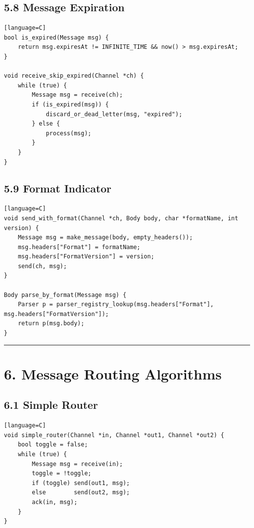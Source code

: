 \documentclass[11pt]{article}
\begin{document}
\subsection{5.8 Message Expiration}\label{message-expiration}

\begin{verbatim}[language=C]
bool is_expired(Message msg) {
    return msg.expiresAt != INFINITE_TIME && now() > msg.expiresAt;
}

void receive_skip_expired(Channel *ch) {
    while (true) {
        Message msg = receive(ch);
        if (is_expired(msg)) {
            discard_or_dead_letter(msg, "expired");
        } else {
            process(msg);
        }
    }
}
\end{verbatim}

\subsection{5.9 Format Indicator}\label{format-indicator}

\begin{verbatim}[language=C]
void send_with_format(Channel *ch, Body body, char *formatName, int version) {
    Message msg = make_message(body, empty_headers());
    msg.headers["Format"] = formatName;
    msg.headers["FormatVersion"] = version;
    send(ch, msg);
}

Body parse_by_format(Message msg) {
    Parser p = parser_registry_lookup(msg.headers["Format"], msg.headers["FormatVersion"]);
    return p(msg.body);
}
\end{verbatim}

\begin{center}\rule{0.5\linewidth}{0.5pt}\end{center}

\section{6. Message Routing
Algorithms}\label{message-routing-algorithms}

\subsection{6.1 Simple Router}\label{simple-router}

\begin{verbatim}[language=C]
void simple_router(Channel *in, Channel *out1, Channel *out2) {
    bool toggle = false;
    while (true) {
        Message msg = receive(in);
        toggle = !toggle;
        if (toggle) send(out1, msg);
        else        send(out2, msg);
        ack(in, msg);
    }
}
\end{verbatim}
\end{document}
